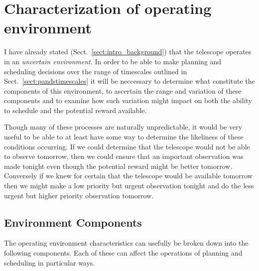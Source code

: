 \section{Characterization of operating environment}
\label{sect:character}

I have already stated (Sect.~\ref{sect:intro_background}) that the telescope operates in an \emph{uncertain environment}. In order to be able to make planning and scheduling decisions over the range of timescales outlined in Sect.~\ref{sect:pandstimescales} it will be neccessary to determine what constitute the components of this environment, to ascertain the range and variation of these components and to examine how such variation might impact on both the ability to schedule and the potential reward available. 
 
Though many of these processes are naturally unpredictable, it would be very useful to be able to at least have some way to determine the likeliness of these conditions occurring. If we could determine that the telescope would not be able to observe tomorrow, then we could ensure that an important observation was made tonight even though the potential reward might be better tomorrow. Conversely if we knew for certain that the telescope would be available tomorrow then we might make a low priority but urgent observation tonight and do the less urgent but higher priority observation tomorrow.

\subsection{Environment Components}
\label{sect:env_components}
The operating environment characteristics can usefully be broken down into the following components. Each of these can affect the operations of planning and scheduling in particular ways.

